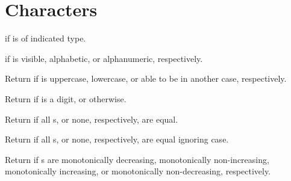 %
%

\section{Characters} 

\begin{LIST}{1cm}

  {
  \retval{\T} if  is of indicated type.
  }

  {
  \retval{\T} if  is visible, alphabetic, or
  alphanumeric, respectively.
  }

  {
  Return \retval{\T} if  is uppercase, lowercase, or
  able to be in another case, respectively.
  }

  {
  Return  if  is a digit, or
  \retval{\NIL} otherwise.
  }

  {
  Return \retval{\T} if all s, or
  none, respectively,  are equal.
  }

  {
  Return \retval{\T} if all s, or
  none, respectively,  are equal ignoring case.
  }

  {
  Return \retval{\T} if s are
  monotonically decreasing, monotonically non-increasing, monotonically
  increasing, or monotonically non-decreasing, respectively.
  }


\end{LIST}
